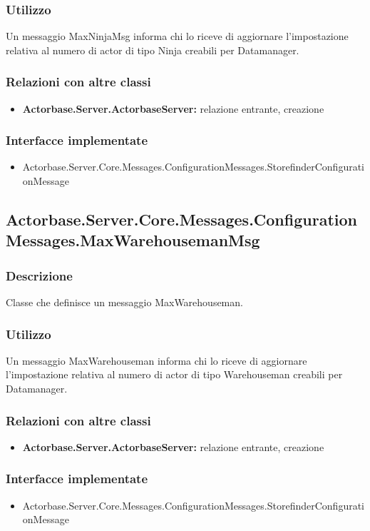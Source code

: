 \documentclass[a4paper]{article}
\begin{document}
			\subsubsection{Utilizzo}
				Un messaggio MaxNinjaMsg informa chi lo riceve di aggiornare l'impostazione relativa al numero di actor di tipo Ninja creabili per Datamanager.
			\subsubsection{Relazioni con altre classi}
			\begin{itemize}
				\item \textbf{Actorbase.Server.ActorbaseServer:} relazione entrante, creazione
			\end{itemize}
			\subsubsection{Interfacce implementate}
			\begin{itemize}
				\item Actorbase.Server.Core.Messages.ConfigurationMessages.StorefinderConfigurationMessage
			\end{itemize}

			\subsection{Actorbase.Server.Core.Messages.ConfigurationMessages.MaxWarehousemanMsg}
			\subsubsection{Descrizione}
				Classe che definisce un messaggio MaxWarehouseman.
			\subsubsection{Utilizzo}
				Un messaggio MaxWarehouseman informa chi lo riceve di aggiornare l'impostazione relativa al numero di actor di tipo Warehouseman creabili per Datamanager.
			\subsubsection{Relazioni con altre classi}
			\begin{itemize}
				\item \textbf{Actorbase.Server.ActorbaseServer:} relazione entrante, creazione
			\end{itemize}
			\subsubsection{Interfacce implementate}
			\begin{itemize}
				\item Actorbase.Server.Core.Messages.ConfigurationMessages.StorefinderConfigurationMessage
			\end{itemize}
\end{document}
